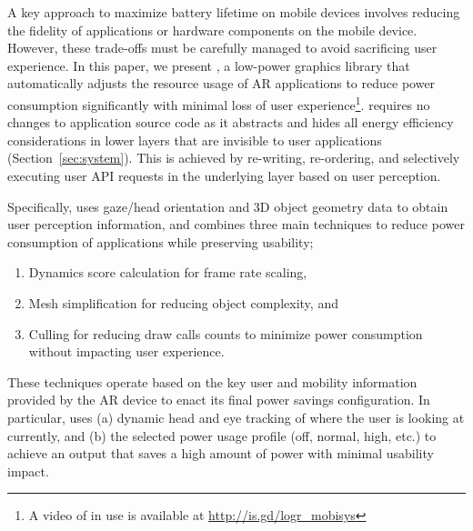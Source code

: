 %



A key approach to maximize battery lifetime on mobile devices involves reducing 
the fidelity of applications or hardware components on the mobile device. 
However, these trade-offs must be carefully managed to avoid sacrificing 
user experience.
%
In this paper, we present {\myit}, a low-power graphics library that 
automatically adjusts the resource usage of AR applications to reduce 
power consumption significantly with minimal loss of user experience\footnote{A video of {\myit} in use is available at \url{http://is.gd/logr\_mobisys}}.
%
{\myit} requires no changes to application source code as it abstracts and
hides all energy efficiency considerations in lower layers that are invisible 
to user applications (Section~\ref{sec:system}).
%
This is achieved by re-writing, re-ordering, and selectively executing
user API requests in the underlying {\myit} layer based on user perception.

Specifically, {\myit} uses gaze/head orientation and 3D object geometry data to obtain
user perception information, and combines three main techniques to reduce power
consumption of applications while preserving usability;
%
\begin{enumerate}[leftmargin=*]

    \item Dynamics score calculation for frame rate scaling,
    
     \item Mesh simplification for reducing object complexity, and
    
    \item Culling for reducing draw calls counts to minimize power 
    consumption without impacting user experience. 

\end{enumerate}
%
These techniques operate based on the key user and mobility information 
provided by the AR device to enact its final power savings configuration.
%
In particular, {\myit} uses (a) dynamic head and eye tracking of where the user
is looking at currently, 
and (b) the selected power usage profile (off, normal, high, etc.) to achieve an
output that saves a high amount of power with minimal usability impact. 

